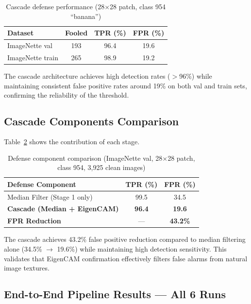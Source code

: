 \documentclass[conference]{IEEEtran}
\begin{document}
\begin{table}[h]
\centering
\caption{Cascade defense performance (28$\times$28 patch, class 954 ``banana'')}
\label{tab:cascade}
\begin{tabular}{lccc}
\toprule
\textbf{Dataset} & \textbf{Fooled} & \textbf{TPR (\%)} & \textbf{FPR (\%)} \\
\midrule
ImageNette val   & 193  & 96.4 & 19.6 \\
ImageNette train & 265  & 98.9 & 19.2 \\
\bottomrule
\end{tabular}
\end{table}

The cascade architecture achieves high detection rates ($>$96\%) while maintaining consistent false positive rates around 19\% on both val and train sets, confirming the reliability of the threshold.

\subsection{Cascade Components Comparison}

Table~\ref{tab:components} shows the contribution of each stage.

\begin{table}[h]
\centering
\caption{Defense component comparison (ImageNette val, 28$\times$28 patch, class 954, 3{,}925 clean images)}
\label{tab:components}
\begin{tabular}{lcc}
\toprule
\textbf{Defense Component} & \textbf{TPR (\%)} & \textbf{FPR (\%)} \\
\midrule
Median Filter (Stage 1 only)               & 99.5 & 34.5 \\
\textbf{Cascade (Median + EigenCAM)}       & \textbf{96.4} & \textbf{19.6} \\
\midrule
\textbf{FPR Reduction}                     & ---  & \textbf{43.2\%} \\
\bottomrule
\end{tabular}
\end{table}

The cascade achieves 43.2\% false positive reduction compared to median filtering alone (34.5\% $\rightarrow$ 19.6\%) while maintaining high detection sensitivity. This validates that EigenCAM confirmation effectively filters false alarms from natural image textures.

\subsection{End-to-End Pipeline Results --- All 6 Runs}
\end{document}
